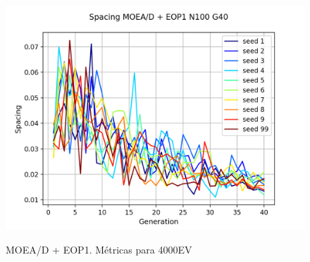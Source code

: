 \begin{figure}[H]
\includegraphics[scale=0.43]{figures/METRICS_EOP1/Spacing_N100_G40.png}\\
\caption{MOEA/D + EOP1. Métricas para 4000EV}
\label{fig:8}
\end{figure}

\hfill\break


